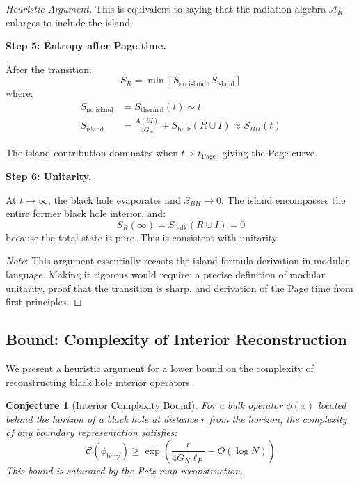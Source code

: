 \documentclass[12pt,a4paper]{article}
\newtheorem{conjecture}[theorem]{Conjecture}
\begin{document}
\begin{proof}[Heuristic Argument]
This is equivalent to saying that the radiation algebra $\mathcal{A}_R$ enlarges to include the island.

\textbf{Step 5: Entropy after Page time.}

After the transition:
\begin{equation}
S_R = \min\left[ S_{\text{no island}}, S_{\text{island}} \right]
\end{equation}
where:
\begin{align}
S_{\text{no island}} &= S_{\text{thermal}}(t) \sim t \\
S_{\text{island}} &= \frac{A(\partial I)}{4G_N} + S_{\text{bulk}}(R \cup I) \approx S_{BH}(t)
\end{align}

The island contribution dominates when $t > t_{\text{Page}}$, giving the Page curve.

\textbf{Step 6: Unitarity.}

At $t \to \infty$, the black hole evaporates and $S_{BH} \to 0$. The island encompasses the entire former black hole interior, and:
\begin{equation}
S_R(\infty) = S_{\text{bulk}}(R \cup I) = 0
\end{equation}
because the total state is pure. This is consistent with unitarity.

\textit{Note}: This argument essentially recasts the island formula derivation in modular language. Making it rigorous would require: a precise definition of modular unitarity, proof that the transition is sharp, and derivation of the Page time from first principles.
\end{proof}

\subsection{Bound: Complexity of Interior Reconstruction}

We present a heuristic argument for a lower bound on the complexity of reconstructing black hole interior operators.

\begin{conjecture}[Interior Complexity Bound]
For a bulk operator $\phi(x)$ located behind the horizon of a black hole at distance $r$ from the horizon, the complexity of any boundary representation satisfies:
\begin{equation}
\mathcal{C}(\phi_{\text{bdry}}) \geq \exp\left( \frac{r}{4G_N \ell_P} - O(\log N) \right)
\end{equation}
This bound is saturated by the Petz map reconstruction.
\end{conjecture}
\end{document}
